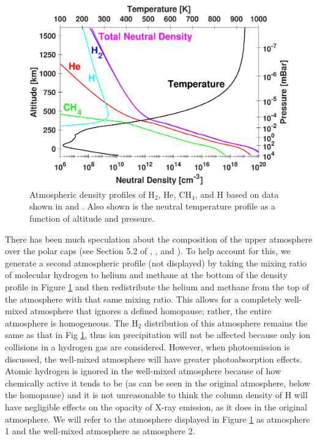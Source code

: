 \documentclass[draft]{agujournal2018}
\begin{document}
\begin{figure}
\centering
\includegraphics[width=\textwidth]{Figures/Atmosphere.eps}
\caption{Atmospheric density profiles of H$_{2}$, He, CH$_{4}$, and H based on data shown in \citet{maurellis2001} and \citet{sinclair2018}. Also shown is the neutral temperature profile as a function of altitude and pressure.}
\label{fig:atm}
\end{figure}

There has been much speculation about the composition of the upper atmosphere over the polar caps (see Section 5.2 of \citet{clark2018}, \citet{gerard2014}, and \citet{parkinson2006}).
To help account for this, we generate a second atmospheric profile (not displayed) by taking the mixing ratio of molecular hydrogen to helium and methane at the bottom of the density profile in Figure \ref{fig:atm} and then redistribute the helium and methane from the top of the atmosphere with that same mixing ratio.
This allows for a completely well-mixed atmosphere that ignores a defined homopause; rather, the entire atmosphere is homogeneous.
The H$_{2}$ distribution of this atmosphere remains the same as that in Fig \ref{fig:atm}, thus ion precipitation will not be affected because only ion collisions in a hydrogen gas are considered.
However, when photoemission is discussed, the well-mixed atmosphere will have greater photoabsorption effects.
Atomic hydrogen is ignored in the well-mixed atmosphere because of how chemically active it tends to be (as can be seen in the original atmosphere, below the homopause) and it is not unreasonable to think the column density of H will have negligible effects on the opacity of X-ray emission, as it does in the original atmosphere.
We will refer to the atmosphere displayed in Figure \ref{fig:atm} as atmosphere 1 and the well-mixed atmosphere as atmosphere 2.
\end{document}
